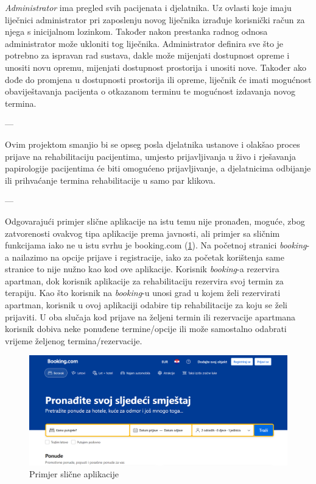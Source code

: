 		\textit{Administrator} ima pregled svih pacijenata i djelatnika. Uz ovlasti koje imaju liječnici administrator pri zaposlenju novog liječnika izrađuje korisnički račun za njega s inicijalnom lozinkom. Također nakon prestanka radnog odnosa administrator može ukloniti tog liječnika. Administrator definira sve što je potrebno za ispravan rad sustava, dakle može mijenjati dostupnost opreme i unositi novu opremu, mijenjati dostupnost prostorija i unositi nove. Također ako dođe do promjena u dostupnosti prostorija ili opreme, liječnik će imati mogućnost obaviještavanja pacijenta o otkazanom terminu te mogućnost izdavanja novog termina.
		
		---
		
		Ovim projektom smanjio bi se opseg posla djelatnika ustanove i olakšao proces prijave na rehabilitaciju pacijentima, umjesto prijavljivanja u živo i rješavanja papirologije pacijentima će biti omogućeno prijavljivanje, a djelatnicima odbijanje ili prihvaćanje termina rehabilitacije u samo par klikova. 
		
		---
		
		Odgovarajući primjer slične aplikacije na istu temu nije pronađen, moguće, zbog zatvorenosti ovakvog tipa aplikacije prema javnosti, ali primjer sa sličnim funkcijama iako ne u istu svrhu je booking.com (\ref{fig:booking}). Na početnoj stranici \textit{booking}-a nailazimo na opcije prijave i registracije, iako za početak korištenja same stranice to nije nužno kao kod ove aplikacije. Korisnik \textit{booking}-a rezervira apartman, dok korisnik aplikacije za rehabilitaciju rezervira svoj termin za terapiju. Kao što korisnik na \textit{booking}-u unosi grad u kojem želi rezervirati apartman, korisnik u ovoj aplikaciji odabire tip rehabilitacije za koju se želi prijaviti. U oba slučaja kod prijave na željeni termin ili rezervacije apartmana korisnik dobiva neke ponuđene termine/opcije ili može samostalno odabrati vrijeme željenog termina/rezervacije. 
		
		\begin{figure}[H]
			\includegraphics[scale=0.4]{slike/slicna_aplikacija.PNG} %
			\centering
			\caption{Primjer slične aplikacije}
			\label{fig:booking}
		\end{figure}
		
